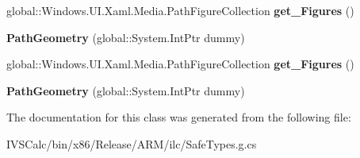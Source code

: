 \begin{DoxyCompactItemize}
global\+::\+Windows.\+U\+I.\+Xaml.\+Media.\+Path\+Figure\+Collection {\bfseries get\+\_\+\+Figures} ()
\item 
\mbox{\label{class_windows_1_1_u_i_1_1_xaml_1_1_media_1_1_path_geometry_a434af4ed71396d646e1e5a69b9c2def7}} 
{\bfseries Path\+Geometry} (global\+::\+System.\+Int\+Ptr dummy)
\item 
\mbox{\label{class_windows_1_1_u_i_1_1_xaml_1_1_media_1_1_path_geometry_a6a286f2ca23fa083907db4f00db6ce2a}} 
global\+::\+Windows.\+U\+I.\+Xaml.\+Media.\+Path\+Figure\+Collection {\bfseries get\+\_\+\+Figures} ()
\item 
\mbox{\label{class_windows_1_1_u_i_1_1_xaml_1_1_media_1_1_path_geometry_a434af4ed71396d646e1e5a69b9c2def7}} 
{\bfseries Path\+Geometry} (global\+::\+System.\+Int\+Ptr dummy)
\end{DoxyCompactItemize}


The documentation for this class was generated from the following file\+:\begin{DoxyCompactItemize}
\item 
I\+V\+S\+Calc/bin/x86/\+Release/\+A\+R\+M/ilc/Safe\+Types.\+g.\+cs\end{DoxyCompactItemize}
